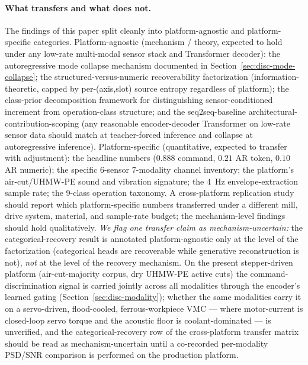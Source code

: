 \documentclass[11pt,a4paper]{article}
\begin{document}
\paragraph{What transfers and what does not.} The findings of this paper split cleanly into platform-agnostic and platform-specific categories. Platform-agnostic (mechanism / theory, expected to hold under any low-rate multi-modal sensor stack and Transformer decoder): the autoregressive mode collapse mechanism documented in Section~\ref{sec:disc-mode-collapse}; the structured-versus-numeric recoverability factorization (information-theoretic, capped by per-(axis,slot) source entropy regardless of platform); the class-prior decomposition framework for distinguishing sensor-conditioned increment from operation-class structure; and the seq2seq-baseline architectural-contribution-scoping (any reasonable encoder-decoder Transformer on low-rate sensor data should match at teacher-forced inference and collapse at autoregressive inference). Platform-specific (quantitative, expected to transfer with adjustment): the headline numbers ($0.888$ command, $0.21$ AR token, $0.10$ AR numeric); the specific 6-sensor 7-modality channel inventory; the platform's air-cut/UHMW-PE sound and vibration signature; the 4~Hz envelope-extraction sample rate; the 9-class operation taxonomy. A cross-platform replication study should report which platform-specific numbers transferred under a different mill, drive system, material, and sample-rate budget; the mechanism-level findings should hold qualitatively. \emph{We flag one transfer claim as mechanism-uncertain:} the categorical-recovery result is annotated platform-agnostic only at the level of the factorization (categorical heads are recoverable while generative reconstruction is not), \emph{not} at the level of the recovery mechanism. On the present stepper-driven platform (air-cut-majority corpus, dry UHMW-PE active cuts) the command-discrimination signal is carried jointly across all modalities through the encoder's learned gating (Section~\ref{sec:disc-modality}); whether the same modalities carry it on a servo-driven, flood-cooled, ferrous-workpiece VMC --- where motor-current is closed-loop servo torque and the acoustic floor is coolant-dominated --- is unverified, and the categorical-recovery row of the cross-platform transfer matrix should be read as mechanism-uncertain until a co-recorded per-modality PSD/SNR comparison is performed on the production platform.

\end{document}
